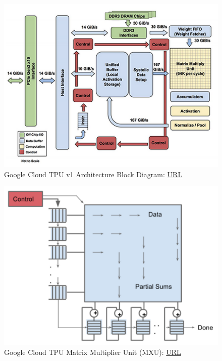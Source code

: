 \begin{figure} [H]
	\centering
	\includegraphics[width=\textwidth]{Images/Hardware/tpu-v1-block-diagram.png}
	\decoRule
	\caption[Google Cloud TPU v1 Architecture Block Diagram]{Google Cloud TPU v1 Architecture Block Diagram: \href{https://cloud.google.com/blog/products/gcp/an-in-depth-look-at-googles-first-tensor-processing-unit-tpu}{URL}}
	\label{fig:tpu-v1-block-diagram}
\end{figure}

\begin{figure} [H]
	\centering
	\includegraphics[scale=0.25]{Images/Hardware/tpu-mxu.png}
	\decoRule
	\caption[Google Cloud TPU Matrix Multiplier Unit (MXU)]{Google Cloud TPU Matrix Multiplier Unit (MXU): \href{https://cloud.google.com/blog/products/gcp/an-in-depth-look-at-googles-first-tensor-processing-unit-tpu}{URL}}
	\label{fig:tpu-mxu}
\end{figure}

